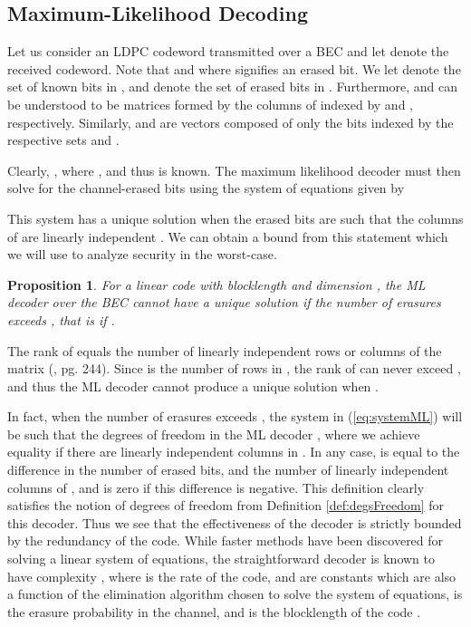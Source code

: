 \documentclass[10pt,twocolumn,twoside]{IEEEtran} \newlength{\pic}
\newtheorem{proposition}{Proposition}
\theoremstyle{definition}
\theoremstyle{remark}
\theoremstyle{plain}
\begin{document}
\subsection{Maximum-Likelihood Decoding}\label{subsec:ML}
Let us consider an LDPC codeword  transmitted over a BEC and let  denote the received codeword. Note that  and  where  signifies an erased bit. We let  denote the set of known bits in , and  denote the set of erased bits in . Furthermore,  and  can be understood to be matrices formed by the columns of  indexed by  and , respectively. Similarly,  and  are vectors composed of only the bits indexed by the respective sets  and .

Clearly, , where , and thus  is known. The maximum likelihood decoder must then solve for the channel-erased bits  using the system of equations given by

This system has a unique solution when the erased bits are such that the columns of  are linearly independent \cite{Urbanke01}. We can obtain a bound from this statement which we will use to analyze security in the worst-case.
\begin{proposition}\label{prop:boundOnSizeKbar}
For a linear code  with blocklength  and dimension , the ML decoder over the BEC cannot have a unique solution if the number of erasures exceeds , that is if .
\end{proposition}
\begin{IEEEproof}
The rank of  equals the number of linearly independent rows or columns of the matrix (\cite{MoonBlack}, pg. 244). Since  is the number of rows in , the rank of  can never exceed , and thus the ML decoder cannot produce a unique solution when .
\end{IEEEproof}
In fact, when the number of erasures exceeds , the system in (\ref{eq:systemML}) will be such that the degrees of freedom in the ML decoder , where we achieve equality if there are  linearly independent columns in  \cite{Burshtein04}. In any case,  is equal to the difference in the number of erased bits, and the number of linearly independent columns of , and is zero if this difference is negative. This definition clearly satisfies the notion of degrees of freedom from Definition \ref{def:degsFreedom} for this decoder. Thus we see that the effectiveness of the decoder is strictly bounded by the redundancy of the code. While faster methods have been discovered for solving a linear system of equations, the straightforward decoder is known to have complexity , where  is the rate of the code,  and  are constants which are also a function of the elimination algorithm chosen to solve the system of equations,  is the erasure probability in the channel, and  is the blocklength of the code \cite{Burshtein04}.
\end{document}
